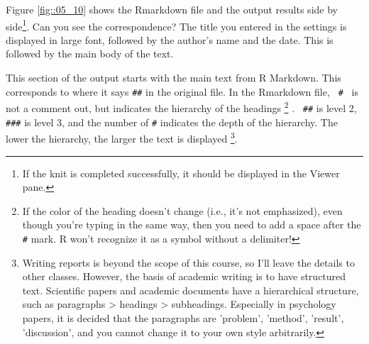 \documentclass{ltjsbook}
\begin{document}


Figure \ref{fig::05_10} shows the Rmarkdown file and the output results side by side\footnote{If the knit is completed successfully, it should be displayed in the Viewer pane.}. Can you see the correspondence? The title you entered in the settings is displayed in large font, followed by the author's name and the date. This is followed by the main body of the text.

This section of the output starts with the main text from R Markdown. This corresponds to where it says \verb|##| in the original file. In the Rmarkdown file, \verb| # | is not a comment out, but indicates the hierarchy of the headings \footnote{If the color of the heading doesn't change (i.e., it's not emphasized), even though you're typing in the same way, then you need to add a space after the \verb|#| mark. R won't recognize it as a symbol without a delimiter!} . \verb| ##| is level 2, \verb|###| is level 3, and the number of \verb|#| indicates the depth of the hierarchy. The lower the hierarchy, the larger the text is displayed \footnote{Writing reports is beyond the scope of this course, so I'll leave the details to other classes. However, the basis of academic writing is to have structured text. Scientific papers and academic documents have a hierarchical structure, such as paragraphs > headings > subheadings. Especially in psychology papers, it is decided that the paragraphs are 'problem', 'method', 'result', 'discussion', and you cannot change it to your own style arbitrarily.}.
\end{document}
